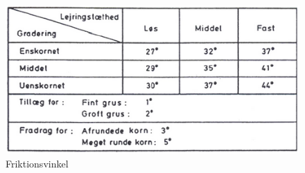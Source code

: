 \begin{figure}[htbp] \centering
	\begin{minipage}[b]{0.48\textwidth}\centering
		\includegraphics[width=1.0\textwidth]{billeder/friktionsvinkel.png}
		\caption{Friktionsvinkel \citep[ s. 170]{geoteknik}}
		\label{fig:friktionsvinkel}
	\end{minipage}\hfill
\end{figure}
